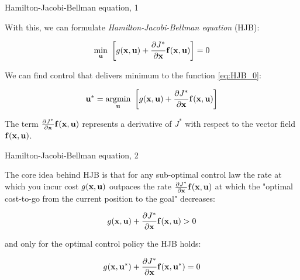 \documentclass{beamer}
\begin{document}
\begin{frame}{Hamilton-Jacobi-Bellman equation, 1}
\begin{flushleft}

With this, we can formulate \emph{Hamilton-Jacobi-Bellman equation} (HJB):

\begin{equation}
\label{eq:HJB_0}
\underset{\bo{u}}{\min} \ 
\left[ 
g(\bo{x}, \bo{u}) + 
\frac{\partial J^*}{\partial \bo{x}} \bo{f} (\bo{x}, \bo{u}) 
\right] = 0
\end{equation}

\bigskip


We can find control that delivers minimum to the function \eqref{eq:HJB_0}:

\begin{equation}
\bo{u}^* = \underset{\bo{u}}{\text{argmin}} \ 
\left[ 
g(\bo{x}, \bo{u}) + 
\frac{\partial J^*}{\partial \bo{x}} \bo{f} (\bo{x}, \bo{u}) \right] 
\end{equation}

The term $\frac{\partial J^*}{\partial \mathbf{x}} \mathbf{f} (\mathbf{x}, \mathbf{u})$ represents a derivative of $J^*$ with respect to the vector field $\mathbf{f} (\mathbf{x}, \mathbf{u})$. 


\end{flushleft}
\end{frame}





\begin{frame}{Hamilton-Jacobi-Bellman equation, 2}
	\begin{flushleft}
		
		The core idea behind HJB is that for any sub-optimal control law the rate at which you incur cost $g(\mathbf{x}, \mathbf{u})$ outpaces the rate $\frac{\partial J^*}{\partial \mathbf{x}} \mathbf{f} (\mathbf{x}, \mathbf{u})$  at which the "optimal cost-to-go from the current position to the goal" decreases: 
		
		\begin{equation}
		g(\mathbf{x}, \mathbf{u}) + 
		\frac{\partial J^*}{\partial \mathbf{x}} \mathbf{f} (\mathbf{x}, \mathbf{u}) > 0
		\end{equation}
		
		and only for the optimal control policy the HJB holds:
		
		\begin{equation}
			g(\mathbf{x}, \mathbf{u}^*) + 
			\frac{\partial J^*}{\partial \mathbf{x}} \mathbf{f} (\mathbf{x}, \mathbf{u}^*) 
			= 0
		\end{equation}
		
	\end{flushleft}
\end{frame}
\end{document}
